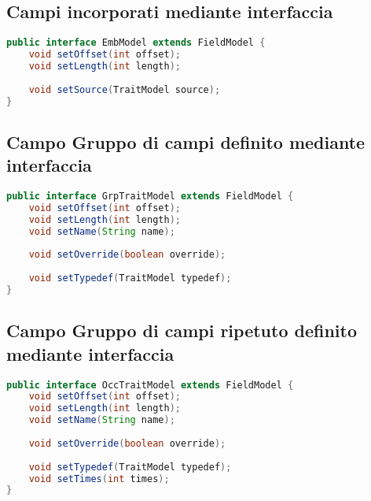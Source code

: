 \documentclass[a4paper,10pt]{report}
\begin{document}
\subsection{Campi incorporati mediante interfaccia}

\begin{lstlisting}[language=java, caption=interfaccia EmbModel, 
label=code:EmbModel]
public interface EmbModel extends FieldModel {
    void setOffset(int offset);
    void setLength(int length);
    
    void setSource(TraitModel source);
}
\end{lstlisting}

\subsection{Campo Gruppo di campi definito mediante interfaccia}

\begin{lstlisting}[language=java, caption=interfaccia GrpTraitModel, 
label=code:GrpTraitModel]
public interface GrpTraitModel extends FieldModel {
    void setOffset(int offset);
    void setLength(int length);
    void setName(String name);
    
    void setOverride(boolean override);
    
    void setTypedef(TraitModel typedef);
}
\end{lstlisting}

\subsection{Campo Gruppo di campi ripetuto definito mediante interfaccia}

\begin{lstlisting}[language=java, caption=interfaccia OccTraitModel, 
label=code:OccTraitModel]
public interface OccTraitModel extends FieldModel {
    void setOffset(int offset);
    void setLength(int length);
    void setName(String name);
    
    void setOverride(boolean override);
    
    void setTypedef(TraitModel typedef);
    void setTimes(int times);
}
\end{lstlisting}
\end{document}
